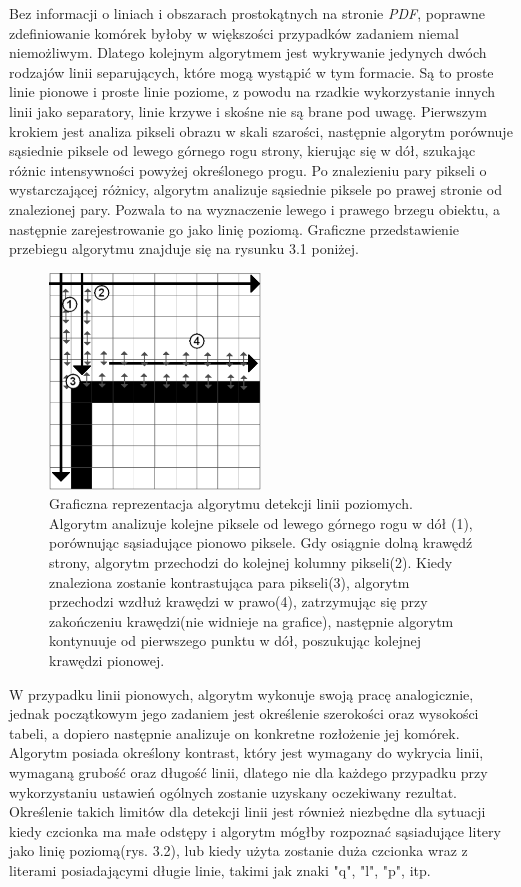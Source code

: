 \documentclass[a4paper,twoside,12pt]{book}
\begin{document}
Bez informacji o liniach i obszarach prostokątnych na stronie \emph{PDF}, poprawne zdefiniowanie komórek byłoby w większości przypadków zadaniem niemal niemożliwym. Dlatego kolejnym algorytmem jest wykrywanie jedynych dwóch rodzajów linii separujących, które mogą wystąpić w tym formacie. Są to proste linie pionowe i proste linie poziome, z powodu na rzadkie wykorzystanie innych linii jako separatory, linie krzywe i skośne nie są brane pod uwagę. Pierwszym krokiem jest analiza pikseli obrazu w skali szarości, następnie algorytm porównuje sąsiednie piksele od lewego górnego rogu strony, kierując się w dół, szukając różnic intensywności powyżej określonego progu. Po znalezieniu pary pikseli o wystarczającej różnicy, algorytm analizuje sąsiednie piksele po prawej stronie od znalezionej pary. Pozwala to na wyznaczenie lewego i prawego brzegu obiektu, a następnie zarejestrowanie go jako linię poziomą. Graficzne przedstawienie przebiegu algorytmu znajduje się na rysunku 3.1 poniżej.

\begin{figure}
\centering
\includegraphics[width=0.5\textwidth]{./images/line_detection.png}
\caption{Graficzna reprezentacja algorytmu detekcji linii poziomych. Algorytm analizuje kolejne piksele od lewego górnego rogu w dół (1), porównując sąsiadujące pionowo piksele. Gdy osiągnie dolną krawędź strony, algorytm przechodzi do kolejnej kolumny pikseli(2). Kiedy znaleziona zostanie kontrastująca para pikseli(3), algorytm przechodzi wzdłuż krawędzi w prawo(4), zatrzymując się przy zakończeniu krawędzi(nie widnieje na grafice), następnie algorytm kontynuuje od pierwszego punktu w dół, poszukując kolejnej krawędzi pionowej.}
\label{fig:pdf_logo}
\end{figure}

W przypadku linii pionowych, algorytm wykonuje swoją pracę analogicznie, jednak początkowym jego zadaniem jest określenie szerokości oraz wysokości tabeli, a dopiero następnie analizuje on konkretne rozłożenie jej komórek. Algorytm posiada określony kontrast, który jest wymagany do wykrycia linii, wymaganą grubość oraz długość linii, dlatego nie dla każdego przypadku przy wykorzystaniu ustawień ogólnych zostanie uzyskany oczekiwany rezultat. Określenie takich limitów dla detekcji linii jest również niezbędne dla sytuacji kiedy czcionka ma małe odstępy i algorytm mógłby rozpoznać sąsiadujące litery jako linię poziomą(rys. 3.2), lub kiedy użyta zostanie duża czcionka wraz z literami posiadającymi długie linie, takimi jak znaki "q", "l", "p", itp.
\end{document}
